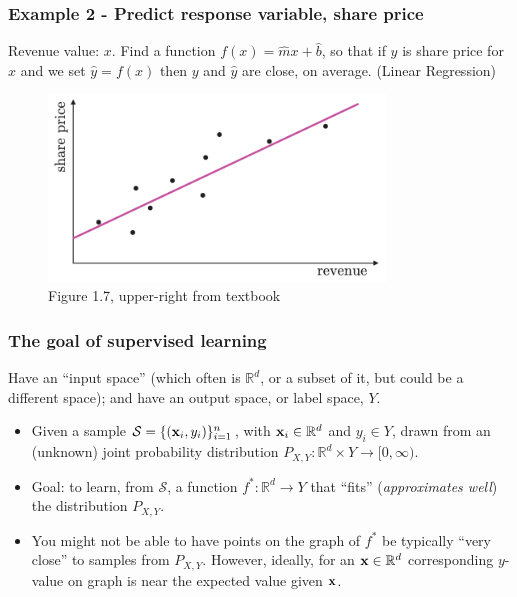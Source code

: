 \documentclass{beamer}
\theoremstyle{example}
\begin{document}
\begin{frame}
    \frametitle{Example 2 - Predict response variable, share price}
    Revenue value: $x$.  Find a function $f(x) = \hat{m}x + \hat{b}$, so that if $y$ is share price for $x$ and we set $\hat{y} = f(x)$ then $y$ and $\hat{y}$ are close, on average. (Linear Regression)

    \begin{figure}
        \includegraphics[width=0.8\textwidth]{../../Images/Fig1-7b.png}
    \caption*{Figure 1.7, upper-right from textbook}
    \end{figure}
\end{frame}

\begin{frame}
\frametitle{The goal of supervised learning}
Have an ``input space'' (which often is $\mathbb R^{d}$, or a subset of it, but could be a different space); and have an output space, or label space, $Y$. 

\pause
\begin{itemize}
    \item Given a sample $\mathcal S = \{({\bf x}_i, y_i)\}_{i=1}^n$, with ${\bf x}_i\in\mathbb R^d$ and $y_i\in Y$, drawn from an (unknown) joint probability distribution $P_{X,Y}:\mathbb R^{d}\times Y \to [0, \infty)$. 
    \pause
    \item Goal: to learn, from $\mathcal S$, a function $f^*:\mathbb R^d\to Y$ that ``fits'' (\textit{approximates well}) the distribution $P_{X,Y}$. 
    \pause
    \item You might not be able to have points on the graph of $f^*$ be typically ``very close'' to samples from $P_{X,Y}$. However, ideally, for an ${\bf x}\in\mathbb R^d$ corresponding $y$-value on graph is near the expected value given ${\bf x}$.
\end{itemize}

\end{frame}
\end{document}
